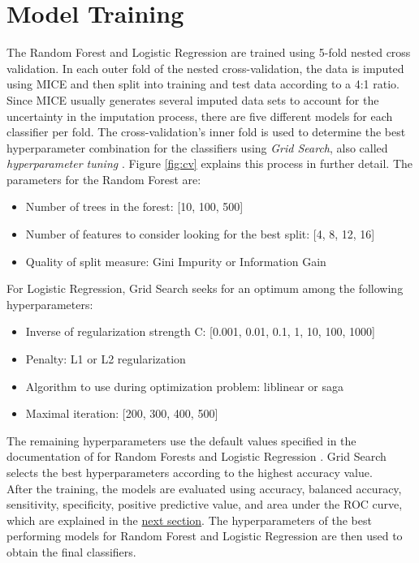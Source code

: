 \section{Model Training}
The Random Forest and Logistic Regression are trained using 5-fold nested cross 
validation.
In each outer fold of the nested cross-validation, the data is imputed using 
MICE and then split into training and test data according to a 4:1 ratio. Since 
MICE usually generates several imputed data sets to account for the uncertainty 
in the imputation process, there are five different models for each classifier 
per fold. The cross-validation's inner fold is used to determine the best 
hyperparameter combination for the classifiers using \textit{Grid Search}, also 
called \textit{hyperparameter tuning} \cite{RN191}. Figure \ref{fig:cv} 
explains this process in further detail. The parameters for the Random Forest 
are:
\begin{itemize}
 \item Number of trees in the forest: [10, 100, 500]
 \item Number of features to consider looking for the best split: [4, 8, 12, 16]
 \item Quality of split measure: Gini Impurity or Information Gain
\end{itemize}
For Logistic Regression, Grid Search seeks for an optimum among the 
following hyperparameters:
\begin{itemize}
 \item Inverse of regularization strength C: [0.001, 0.01, 0.1, 1, 10, 100, 
1000]
 \item Penalty: L1 or L2 regularization
 \item Algorithm to use during optimization problem: liblinear or saga
 \item Maximal iteration: [200, 300, 400, 500]
\end{itemize}
The remaining hyperparameters use the default values specified in the 
documentation of  for Random Forests and Logistic Regression 
\cite{RN191}.
Grid Search selects the best hyperparameters according to the highest accuracy 
value.
\\
After the training, the models are evaluated using accuracy, balanced 
accuracy, sensitivity, 
specificity, positive predictive value, and area under the ROC curve, which are 
explained in the \hyperref[sec:eval]{next section}.
The hyperparameters of the best performing models for Random Forest and 
Logistic Regression are then used to obtain the final classifiers.
